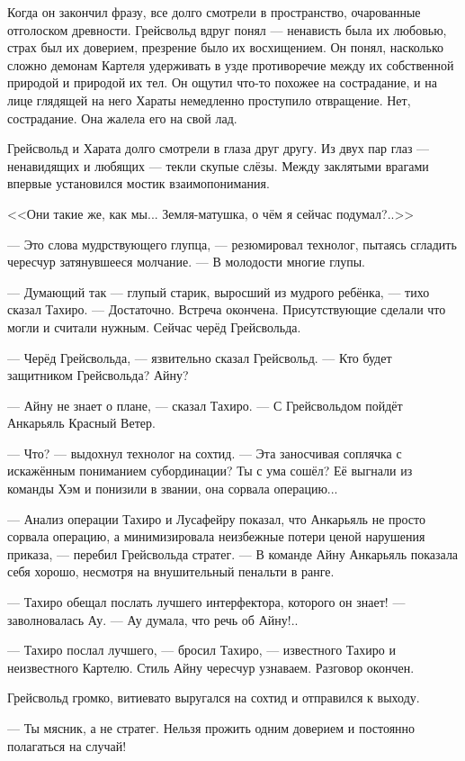 Когда он закончил фразу, все долго смотрели в пространство, очарованные отголоском древности.
Грейсвольд вдруг понял --- ненависть была их любовью, страх был их доверием, презрение было их восхищением.
Он понял, насколько сложно демонам Картеля удерживать в узде противоречие между их собственной природой и природой их тел.
Он ощутил что-то похожее на сострадание, и на лице глядящей на него Хараты немедленно проступило отвращение.
Нет, сострадание.
Она жалела его на свой лад.

Грейсвольд и Харата долго смотрели в глаза друг другу.
Из двух пар глаз --- ненавидящих и любящих --- текли скупые слёзы.
Между заклятыми врагами впервые установился мостик взаимопонимания.

<<Они такие же, как мы...
Земля-матушка, о чём я сейчас подумал?..>>

--- Это слова мудрствующего глупца, --- резюмировал технолог, пытаясь сгладить чересчур затянувшееся молчание.
--- В молодости многие глупы.

--- Думающий так --- глупый старик, выросший из мудрого ребёнка, --- тихо сказал Тахиро.
--- Достаточно.
Встреча окончена.
Присутствующие сделали что могли и считали нужным.
Сейчас черёд Грейсвольда.

--- Черёд Грейсвольда, --- язвительно сказал Грейсвольд.
--- Кто будет защитником Грейсвольда?
Айну?

--- Айну не знает о плане, --- сказал Тахиро.
--- С Грейсвольдом пойдёт Анкарьяль Красный Ветер.

--- Что? --- выдохнул технолог на сохтид.
--- Эта заносчивая соплячка с искажённым пониманием субординации?
Ты с ума сошёл?
Её выгнали из команды Хэм и понизили в звании, она сорвала операцию...

--- Анализ операции Тахиро и Лусафейру показал, что Анкарьяль не просто сорвала операцию, а минимизировала неизбежные потери ценой нарушения приказа, --- перебил Грейсвольда стратег.
--- В команде Айну Анкарьяль показала себя хорошо, несмотря на внушительный пенальти в ранге.

--- Тахиро обещал послать лучшего интерфектора, которого он знает! --- заволновалась Ау.
--- Ау думала, что речь об Айну!..

--- Тахиро послал лучшего, --- бросил Тахиро, --- известного Тахиро и неизвестного Картелю.
Стиль Айну чересчур узнаваем.
Разговор окончен.

Грейсвольд громко, витиевато выругался на сохтид и отправился к выходу.

--- Ты мясник, а не стратег.
Нельзя прожить одним доверием и постоянно полагаться на случай!

